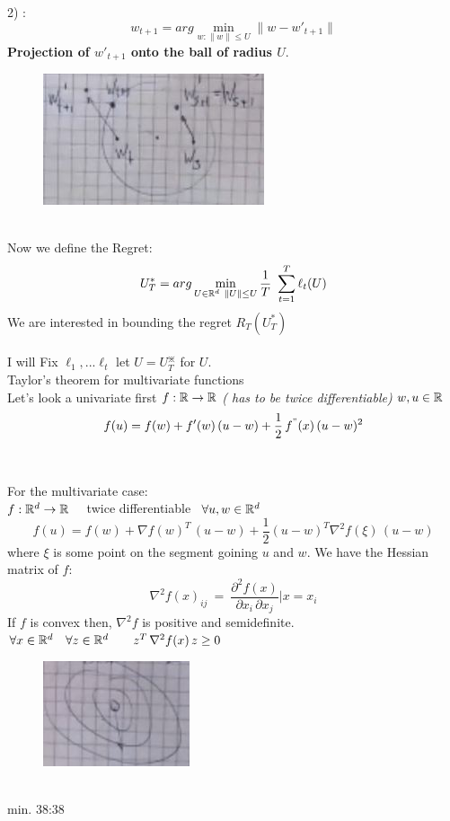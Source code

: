 \documentclass[../main.tex]{subfiles}
\begin{document}
2) : $$
w_{t+1} = arg \min_{w: \| w \| \leq U} \| w- w'_{t+1} \| $$ \textbf{Projection of $w'_{t+1}$ onto the ball of radius $U$}.
\begin{figure}[h]
    \centering
    \includegraphics[width=0.3\linewidth]{../img/lez15-img2.JPG}
    \caption{}
\end{figure}\\
Now we define the Regret:
$$
U^*_T = arg \min_{U \in \mathbb{R}^d \ \|U \| \leq U} \frac{1}{T} \ \sum_{t=1}^{T} \ell_t(U)
$$
We are interested in bounding the regret $R_T\left(U^*_T\right) $
\\\\
I will Fix $\ell_1, ... \ell_t$ \qquad let $U= U^{\divideontimes}_T$ for $U$.
\\
Taylor's theorem for multivariate functions\\
Let's look a univariate first \quad $f: \mathbb{R} \rightarrow \mathbb{R}$ \textit{( has to be twice differentiable) }\qquad $w, u \in \mathbb{R}$
$$
f(u) = f(w) + f'(w) \, (u-w) + \frac{1}{2} \, f^"(x) \, (u-w)^2
$$
\\\\
For the multivariate case:
\\
$f: \mathbb{R}^d \rightarrow \mathbb{R} \quad$ twice differentiable \ $ \forall u, w \in \mathbb{R}^d$
$$
f(u) = f(w) + \nabla f(w)^T \, (u-w) + \frac{1}{2} \left(u-w\right)^T \nabla^2 f(\xi) \, (u-w)
$$
where $\xi$ is some point on the segment goining $u$ and $w$.
We have the Hessian matrix of $f$:
$$
\nabla^2 f(x)_{ij} \ = \ \frac{\partial^2 f(x)}{\partial x_i \, \partial x_j} \vert x=x_i
$$
If $f$ is convex then, $\nabla^2 f$ is positive and semidefinite.\\
$
\forall x \in \mathbb{R}^d \quad \forall z \in \mathbb{R}^d \qquad z^T \, \nabla^2 f(x) \, z \geq 0
$
\begin{figure}[h]
    \centering
    \includegraphics[width=0.3\linewidth]{../img/lez15-img3.JPG}
    \caption{}
\end{figure}\\

min. 38:38
\end{document}
